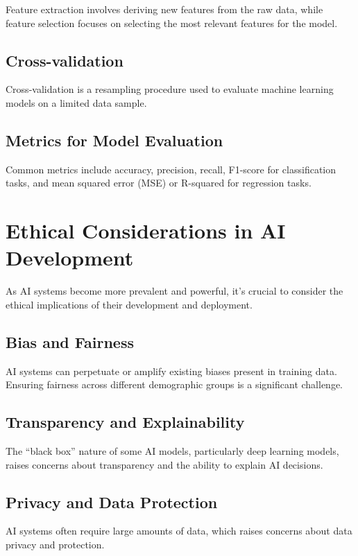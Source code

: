 Feature extraction involves deriving new features from the raw data,
while feature selection focuses on selecting the most relevant features
for the model.

\subsection{Cross-validation}

Cross-validation is a resampling procedure used to evaluate machine
learning models on a limited data sample.

\subsection{Metrics for Model Evaluation}

Common metrics include accuracy, precision, recall, F1-score for
classification tasks, and mean squared error (MSE) or R-squared for
regression tasks.

\section{Ethical Considerations in AI Development}

As AI systems become more prevalent and powerful, it's crucial to
consider the ethical implications of their development and deployment.

\subsection{Bias and Fairness}

AI systems can perpetuate or amplify existing biases present in training
data. Ensuring fairness across different demographic groups is a
significant challenge.

\subsection{Transparency and Explainability}

The ``black box'' nature of some AI models, particularly deep learning
models, raises concerns about transparency and the ability to explain AI
decisions.

\subsection{Privacy and Data Protection}

AI systems often require large amounts of data, which raises concerns
about data privacy and protection.

